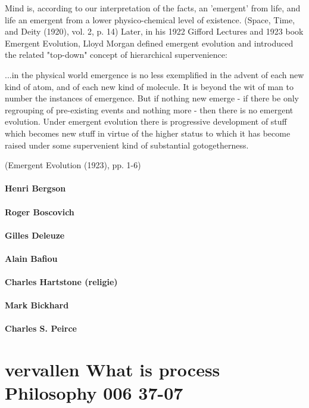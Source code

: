 \documentclass[a4paper]{Thesis}
\begin{document}
	Mind is, according to our interpretation of the facts, an 'emergent' from life, and life an emergent from a lower physico-chemical level of existence.
	(Space, Time, and Deity (1920), vol. 2, p. 14)
	Later, in his 1922 Gifford Lectures and 1923 book Emergent Evolution, Lloyd Morgan defined emergent evolution and introduced the related "top-down" concept of hierarchical supervenience:
	
	...in the physical world emergence is no less exemplified in the advent of each new kind of atom, and of each new kind of molecule. It is beyond the wit of man to number the instances of emergence. But if nothing new emerge - if there be only regrouping of pre-existing events and nothing more - then there is no emergent evolution.
	Under emergent evolution there is progressive development of stuff which becomes new stuff in virtue of the higher status to which it has become raised under some supervenient kind of substantial gotogetherness.
	
	(Emergent Evolution (1923), pp. 1-6)
	
	\subsubsection{Henri Bergson}
	\subsubsection{Roger Boscovich}
	\subsubsection{Gilles Deleuze}
	\subsubsection{Alain Bafiou}
	\subsubsection{Charles Hartstone (religie)}
	\subsubsection{Mark Bickhard}
	\subsubsection{Charles S. Peirce}

\chapter{vervallen What is process Philosophy 006 37-07}
\end{document}
